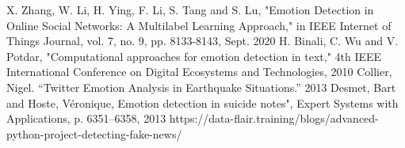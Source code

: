 \documentclass[conference]{IEEEtran}
\begin{document}
\begin{thebibliography}{00}
 X. Zhang, W. Li, H. Ying, F. Li, S. Tang and S. Lu, "Emotion Detection in Online Social Networks: A Multilabel Learning Approach," in IEEE Internet of Things Journal, vol. 7, no. 9, pp. 8133-8143, Sept. 2020
 H. Binali, C. Wu and V. Potdar, "Computational approaches for emotion detection in text," 4th IEEE International Conference on Digital Ecosystems and Technologies, 2010
 Collier, Nigel. “Twitter Emotion Analysis in Earthquake Situations.” 2013
 Desmet, Bart and Hoste, Véronique, Emotion detection in suicide notes", Expert Systems with Applications,
p. 6351–6358, 2013
 https://data-flair.training/blogs/advanced-python-project-detecting-fake-news/

\end{thebibliography}
\end{document}
